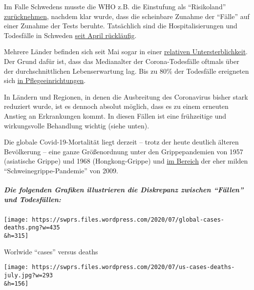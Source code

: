 Im Falle Schwedens musste die WHO z.B. die Einstufung als ``Risikoland''
\href{https://www.n-tv.de/panorama/Langfristig-koennte-Schweden-richtig-liegen-article21876864.html}{zurücknehmen},
nachdem klar wurde, dass die scheinbare Zunahme der ``Fälle'' auf einer
Zunahme der Tests beruhte. Tatsächlich sind die Hospitalisierungen und
Todesfälle in Schweden
\href{https://swprs.files.wordpress.com/2020/07/sweden-icu-deaths-june-28.png}{seit
April rückläufig}.

Mehrere Länder befinden sich seit Mai sogar in einer
\href{https://www.euromomo.eu/graphs-and-maps/\#z-scores-by-country}{relativen
Untersterblichkeit}. Der Grund dafür ist, dass das Medianalter der
Corona-Todesfälle oftmals über der durchschnittlichen Lebenserwartung
lag. Bis zu 80\% der Todesfälle ereigneten sich
\href{https://swprs.org/studies-on-covid-19-lethality/\#care-homes}{in
Pflegeeinrichtungen}.

In Ländern und Regionen, in denen die Ausbreitung des Coronavirus bisher
stark reduziert wurde, ist es dennoch absolut möglich, dass es zu einem
erneuten Anstieg an Erkrankungen kommt. In diesen Fällen ist eine
frühzeitige und wirkungsvolle Behandlung wichtig (siehe unten).

Die globale Covid-19-Mortalität liegt derzeit -- trotz der heute
deutlich älteren Bevölkerung -- eine ganze Größen­ordnung unter den
Grippepandemien von 1957 (asiatische Grippe) und 1968 (Hongkong-Grippe)
und
\href{https://swprs.files.wordpress.com/2020/06/covid-19-comparison-e1592927192181.png}{im
Bereich} der eher milden ``Schweinegrippe-Pandemie'' von 2009.

\hypertarget{die-folgenden-grafiken-illustrieren-die-diskrepanz-zwischen-fuxe4llen-und-todesfuxe4llen}{%
\subparagraph{Die folgenden Grafiken illustrieren die Diskrepanz
zwischen ``Fällen'' und
Todesfällen:}\label{die-folgenden-grafiken-illustrieren-die-diskrepanz-zwischen-fuxe4llen-und-todesfuxe4llen}}

\href{https://swprs.files.wordpress.com/2020/07/global-cases-deaths.png}{}

\texttt{[image: https://swprs.files.wordpress.com/2020/07/global-cases-deaths.png?w=435\\\&h=315]}

Worlwide ``cases'' versus deaths

\href{https://swprs.files.wordpress.com/2020/07/us-cases-deaths-july.jpg}{}

\texttt{[image: https://swprs.files.wordpress.com/2020/07/us-cases-deaths-july.jpg?w=293\\\&h=156]}

